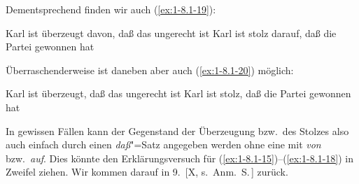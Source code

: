 \documentclass[output=paper]{langsci/langscibook}
\begin{document}
Dementsprechend finden wir auch (\ref{ex:1-8.1-19}):
\begin{exe}
\ex\label{ex:1-8.1-19}
\begin{xlist}
\ex\label{ex:1-8.1-19a} Karl ist überzeugt davon, daß das ungerecht ist
\ex\label{ex:1-8.1-19b} Karl ist stolz darauf, daß die Partei gewonnen hat
\end{xlist}
\end{exe}
Überraschenderweise ist daneben aber auch (\ref{ex:1-8.1-20}) möglich:
\begin{exe}
\ex\label{ex:1-8.1-20}
\begin{xlist}
\ex\label{ex:1-8.1-20a} Karl ist überzeugt, daß das ungerecht ist
\ex\label{ex:1-8.1-20b} Karl ist stolz, daß die Partei gewonnen hat
\end{xlist}
\end{exe}
In gewissen Fällen kann der Gegenstand der Überzeugung bzw.\ des Stolzes also auch
einfach durch einen \textit{daß}"=Satz angegeben werden ohne eine  mit
\textit{von} bzw.\ \textit{auf}. Dies könnte den Erklärungsversuch für
(\ref{ex:1-8.1-15})–(\ref{ex:1-8.1-18}) in Zweifel ziehen. Wir kommen darauf in 9.\ [X,
  s.\ Anm.\ S.\,\pageref{fn-herausgeber-topo}] zurück. 
\end{document}
